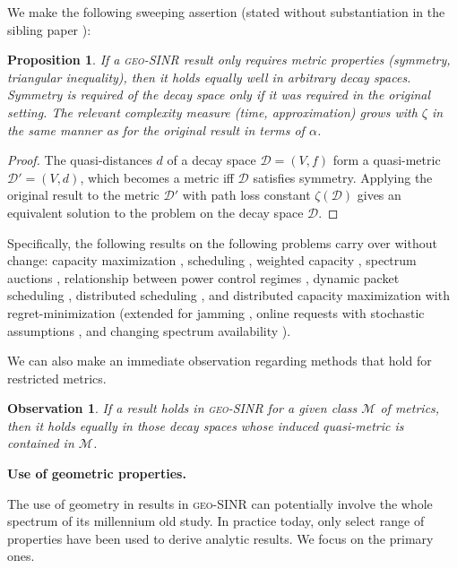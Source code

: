 \documentclass[11pt]{amsart}
\newcounter{foo}
\newtheorem{observation}[lemma]{Observation}
\newtheorem{proposition}[foo]{Proposition}
\def\calD{{\mathcal{D}}}
\def\calM{{\mathcal{M}}}
\newcommand{\geomodel}{\textsc{geo-SINR}}
\newcommand{\mypara}[1]{\smallskip\noindent\textbf{#1.}}  \newcommand{\tightpara}[1]{\noindent\textbf{#1.}}  \newcommand{\inddim}{D}
\begin{document}
We make the following sweeping assertion (stated without substantiation
in the sibling paper \cite{us:ICDCS14}):

\begin{proposition}
  If a {\geomodel} result only requires metric properties (symmetry, triangular
  inequality), then it holds equally well in arbitrary decay spaces.  Symmetry
  is required of the decay space only if it was required in the
  original setting.  The relevant complexity measure (time,
  approximation) grows with $\zeta$ in the same manner as for the
  original result in terms of $\alpha$.
\label{prop:metric}
\end{proposition}

\begin{proof}
The quasi-distances $d$ of a decay space $\calD=(V,f)$
form a quasi-metric $\calD'=(V,d)$, which becomes a metric 
iff $\calD$ satisfies symmetry. 
Applying the original result to the metric $\calD'$ with path
loss constant $\zeta(\calD)$ gives an equivalent solution to the problem
on the decay space $\calD$.
\end{proof}

Specifically, the following results on the following problems carry over without change: 
capacity maximization \cite{SODA11,KesselheimESA12}, 
scheduling \cite{FKRV09,FKV09},
weighted capacity \cite{us:talg12,us:Infocom12}, 
spectrum auctions \cite{hoeferspaa,HoeferK12},
relationship between power control regimes \cite{tonoyan2011a,us:SODA13},
dynamic packet scheduling \cite{CISS12,sirocco12,kesselheimStability,us:SODA13}, 
distributed scheduling \cite{KV10,icalp11}, and
distributed capacity maximization with regret-minimization \cite{infocom11}
(extended for jamming \cite{dams2013jamming}, 
online requests with stochastic assumptions \cite{GHKSV13},
and changing spectrum availability \cite{dams2013sleeping}).

We can also make an immediate observation regarding methods that
hold for restricted metrics.
\begin{observation}
If a result holds in {\geomodel} for a given class $\calM$ of metrics,
then it holds equally in those decay spaces whose induced quasi-metric
is contained in $\calM$.
\label{asst:metric}
\end{observation}



\iffalse \mypara{Use of geometric properties}

The use of geometry in results in {\geomodel}
can potentially involve the whole spectrum of its millennium old study.
In practice today, only select range of properties have been used to
derive analytic results. We focus on the primary ones.
\end{document}
